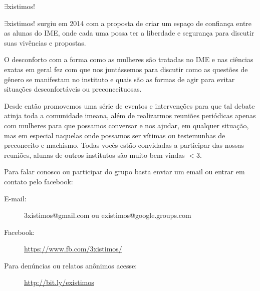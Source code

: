 \begin{subsecao}{$\exists$xistimos!}



$\exists$xistimos! surgiu em 2014 com a proposta de criar um espaço de
confiança entre as alunas do IME, onde cada uma possa ter a liberdade e
segurança para discutir suas vivências e propostas.

O desconforto com a forma como as mulheres são tratadas no IME e nas ciências
exatas em geral fez com que nos juntássemos para discutir como as questões de
gênero se manifestam no instituto e quais são as formas de agir para evitar
situações desconfortáveis ou preconceituosas.

Desde então promovemos uma série de eventos e intervenções para que tal debate
atinja toda a comunidade imeana, além de realizarmos reuniões periódicas apenas
com mulheres para que possamos conversar e nos ajudar, em qualquer situação,
mas em especial naquelas onde possamos ser vítimas ou testemunhas de  
preconceito e machismo. Todas vocês estão convidadas a participar das nossas  
reuniões, alunas de outros institutos são muito bem vindas $<$3.

Para falar conosco ou participar do grupo basta enviar um email ou entrar em
contato pelo facebook:


\begin{description}

\item[E-mail:] 3xistimos@gmail.com ou existimos@google.groups.com
\item[Facebook:] \url{https://www.fb.com/3xistimos/}
\item[Para denúncias ou relatos anônimos acesse:] \url{http://bit.ly/existimos}

\end{description}


\end{subsecao}

